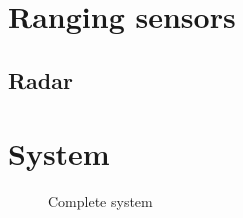 \chapter{Ranging sensors}
\section{Radar}
\chapter{System}

\begin{figure}[H]
\centering

  \caption{Complete system}
  \label{fig:Null}
\end{figure}